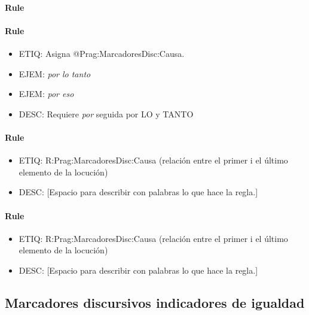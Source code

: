 \documentclass[11pt]{report}
\begin{document}
\paragraph*{Rule}
\paragraph*{Rule}
\begin{itemize}
\item ETIQ: Asigna @Prag:MarcadoresDisc:Causa.
\item EJEM: \emph{por lo tanto}
\item EJEM: \emph{por eso}
\item DESC: Requiere \emph{por} seguida por LO y TANTO
\end{itemize}

\paragraph*{Rule}
\begin{itemize}
\item ETIQ: R:Prag:MarcadoresDisc:Causa (relación entre el primer i el último elemento de la locución)
\item DESC: [Espacio para describir con palabras lo que hace la regla.]
\end{itemize}

\paragraph*{Rule}
\begin{itemize}
\item ETIQ: R:Prag:MarcadoresDisc:Causa (relación entre el primer i el último elemento de la locución)
\item DESC: [Espacio para describir con palabras lo que hace la regla.]
\end{itemize}

\subsection{Marcadores discursivos indicadores de igualdad}
\end{document}
